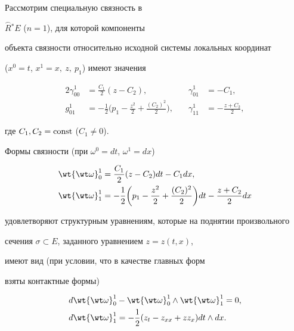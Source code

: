 \begin{exams}


Рассмотрим специальную связность в


$\overset{\frown}{R}{}^ * E$ (${n=1}$), для которой компоненты 


объекта связности относительно исходной системы локальных координат


($x^0=t$, $x^1=x,\ z,\ p_1$) имеют значения


\begin{alignat*}{2}


\gamma_{00}^1&=\frac{{C_1}}{2} ({z-C_2}),& \quad \gamma_{01}^1&=- C_1, \\


g_{01}^1&=- \frac{1}{2} \bigg({p_1-\frac{{z^2}}{2}+\frac{{({C_2})^2}}{2}}


\bigg), & \quad \gamma_{11}^1&=- \frac{{z+C_2}}{2}, 


\end{alignat*}


где $C_1, C_2=\operatorname{const}$ (${C_1 \ne 0}$).


Формы связности (при $\omega^0=dt$, $\omega^1=dx$)


\begin{align*}


{\wt {\wt \omega}}_0^1&=\frac{C_1}{2} ({z-C_2})dt-C_1 dx,\\


{\wt {\wt \omega}}_1^1&=- \frac{1}{2}


\bigg(p_1-\frac{z^2}{2}+\frac{({C_2})^2}{2}\bigg)dt


-\frac{z+C_2}{2}dx


\end{align*}


удовлетворяют структурным уравнениям, которые на поднятии произвольного 


сечения $\sigma \subset E$, заданного уравнением $z=z ({t,x})$,


имеют вид (при условии, что в качестве главных форм 


взяты контактные формы)


\begin{align*}


&d{\wt {\wt \omega}}_0^1-{\wt {\wt \omega}}_0^1


\wedge {\wt {\wt \omega}}_1^1 = 0, \\


&d{\wt {\wt \omega}}_1^1 =-\frac{1}{2}


({z_t-z_{xx}+z z_x})dt \wedge dx. 



\end{align*}
\end{exams}
